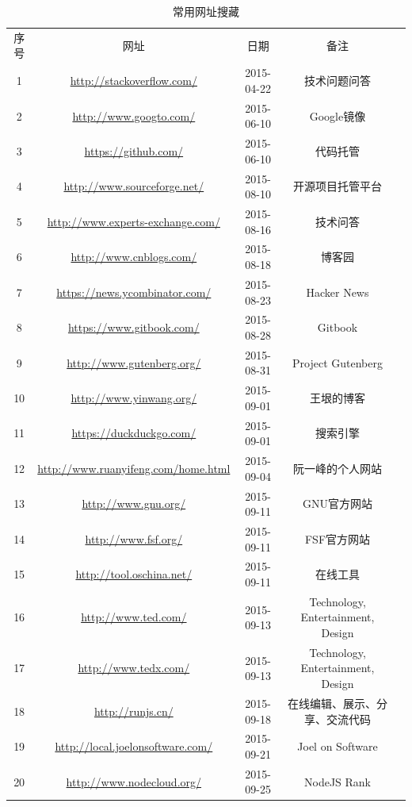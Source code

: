 \documentclass{book}
\begin{document}
\begin{longtable}{|c|c|c|c|c|}
	\caption{常用网址搜藏}\\
	\hline
	\multirow{1}{*}{序号}
	& \multicolumn{1}{c|}{网址}  
	& \multicolumn{1}{c|}{日期} 
	& \multicolumn{1}{c|}{备注}\\			
	\cline{1-4}
	1 & \url{http://stackoverflow.com/} & 2015-04-22 & 技术问题问答\\
	\hline
	2 & \url{http://www.googto.com/} & 2015-06-10 & Google镜像\\
	\hline
	3 & \url{https://github.com/} & 2015-06-10 & 代码托管\\
	\hline
	4 & \url{http://www.sourceforge.net/} & 2015-08-10 & 开源项目托管平台\\
	\hline
	5 & \url{http://www.experts-exchange.com/} & 2015-08-16 & 技术问答\\
	\hline
	6 & \url{http://www.cnblogs.com/} & 2015-08-18 & 博客园\\
	\hline
	7 & \url{https://news.ycombinator.com/} & 2015-08-23 & Hacker News\\
	\hline
	8 & \url{https://www.gitbook.com/} & 2015-08-28 & Gitbook\\
	\hline
	9 & \url{http://www.gutenberg.org/} & 2015-08-31 & Project Gutenberg\\
	\hline
	10 & \url{http://www.yinwang.org/} & 2015-09-01 & 王垠的博客\\
	\hline
	11 & \url{https://duckduckgo.com/} & 2015-09-01 & 搜索引擎\\
	\hline
	12 & \url{http://www.ruanyifeng.com/home.html} & 2015-09-04 & 阮一峰的个人网站\\
	\hline
	13 & \url{http://www.gnu.org/} & 2015-09-11 & GNU官方网站\\
	\hline
	14 & \url{http://www.fsf.org/} & 2015-09-11 & FSF官方网站\\
	\hline
	15 & \url{http://tool.oschina.net/} & 2015-09-11 & 在线工具\\
	\hline
	16 & \url{http://www.ted.com/} & 2015-09-13 & Technology, Entertainment, Design\\
	\hline
	17 & \url{http://www.tedx.com/} & 2015-09-13 & Technology, Entertainment, Design\\
	\hline
	18 & \url{http://runjs.cn/} & 2015-09-18 & 在线编辑、展示、分享、交流代码\\
	\hline
	19 & \url{http://local.joelonsoftware.com/} & 2015-09-21 & Joel on Software\\
	\hline
	20 & \url{http://www.nodecloud.org/} & 2015-09-25 & NodeJS Rank\\

\end{longtable}
\end{document}
